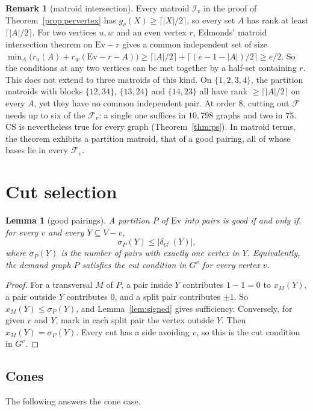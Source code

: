 \documentclass[11pt]{amsart}
\newtheorem{lemma}[theorem]{Lemma}
\theoremstyle{definition}
\newtheorem*{remark*}{Remark}
\newcommand{\Ev}{\mathrm{Ev}}
\newcommand{\cF}{\mathcal F}
\begin{document}
\begin{remark*}[matroid intersection]
Every matroid $\mathcal I_v$ in the proof of Theorem~\ref{prop:pervertex} has
$g_v(X)\ge\lceil|X|/2\rceil$, so every set $A$ has rank at least $\lceil|A|/2\rceil$. For two vertices
$u,w$ and an even vertex $r$, Edmonds' matroid intersection theorem on $\Ev-r$ gives a common
independent set of size
$\min_A\bigl(r_u(A)+r_w(\Ev-r-A)\bigr)\ge\lceil|A|/2\rceil+\lceil(e-1-|A|)/2\rceil\ge e/2$. So the
conditions at any two vertices can be met together by a half-set containing $r$. This does not
extend to three matroids of this kind. On $\{1,2,3,4\}$, the partition matroids with blocks
$\{12,34\}$, $\{13,24\}$ and $\{14,23\}$ all have rank $\ge\lceil|A|/2\rceil$ on every $A$, yet they
have no common independent pair. At order $8$, cutting out $\cF$ needs up to six of the $\cF_v$: a
single one suffices in $10{,}798$ graphs and two in $75$. CS is nevertheless true for every graph
(Theorem~\ref{thm:ps}). In matroid terms, the theorem exhibits a partition matroid, that of a good
pairing, all of whose bases lie in every $\cF_v$.
\end{remark*}

\section{Cut selection}\label{sec:cs}

\begin{lemma}[good pairings]\label{lem:pairing}
A partition $P$ of $\Ev$ into pairs is good if and only if, for every $v$ and every $Y\subseteq V-v$,
\[
\sigma_P(Y)\le|\delta_{G^v}(Y)|,
\]
where $\sigma_P(Y)$ is the number of pairs with exactly one vertex in $Y$. Equivalently, the demand
graph $P$ satisfies the cut condition in $G^v$ for every vertex $v$.
\end{lemma}

\begin{proof}
For a transversal $M$ of $P$, a pair inside $Y$ contributes $1-1=0$ to $x_M(Y)$, a pair outside $Y$
contributes $0$, and a split pair contributes $\pm1$. So $x_M(Y)\le\sigma_P(Y)$, and
Lemma~\ref{lem:signed} gives sufficiency. Conversely, for given $v$ and $Y$, mark in each split pair
the vertex outside $Y$. Then $x_M(Y)=\sigma_P(Y)$. Every cut has a side avoiding $v$, so this is the
cut condition in $G^v$.
\end{proof}

\subsection{Cones}
The following answers the cone case.
\end{document}

